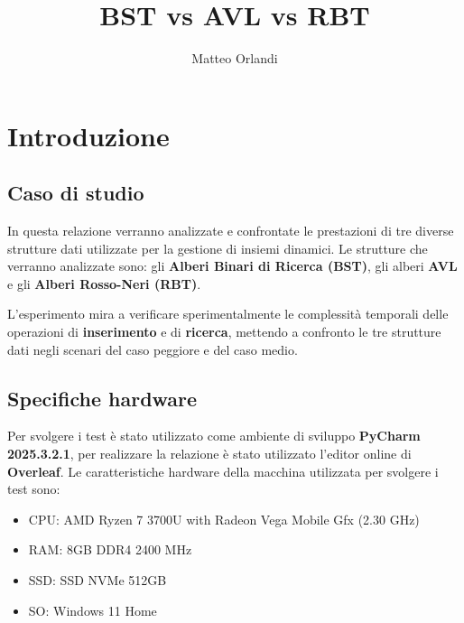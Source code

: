 \documentclass{article}
\title{BST vs AVL vs RBT}
\author{Matteo Orlandi}
\begin{document}
\maketitle



\section{Introduzione}

\subsection{Caso di studio}
In questa relazione verranno analizzate e confrontate le prestazioni di tre diverse strutture dati utilizzate per la gestione di insiemi dinamici. Le strutture che verranno analizzate sono: gli \textbf{Alberi Binari di Ricerca (BST)}, gli alberi \textbf{AVL} e gli \textbf{Alberi Rosso-Neri (RBT)}.

\bigskip
L'esperimento mira a verificare sperimentalmente le complessità temporali delle operazioni di \textbf{inserimento} e di \textbf{ricerca}, mettendo a confronto le tre strutture dati negli scenari del caso peggiore e del caso medio.

\subsection{Specifiche hardware}
Per svolgere i test è stato utilizzato come ambiente di sviluppo \textbf{PyCharm 2025.3.2.1}, per realizzare la relazione è stato utilizzato l'editor online di \textbf{Overleaf}.
Le caratteristiche hardware della macchina utilizzata per svolgere i test sono:
\begin{itemize}
    \item CPU: AMD Ryzen 7 3700U with Radeon Vega Mobile Gfx   (2.30 GHz)
    \item RAM: 8GB DDR4 2400 MHz
    \item SSD: SSD NVMe 512GB
    \item SO: Windows 11 Home
\end{itemize}

\end{document}
